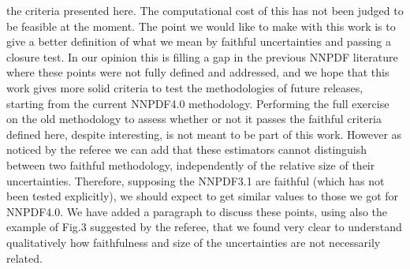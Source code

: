 \documentclass[11pt,a4paper]{article}
\numberwithin{equation}{section}
\numberwithin{figure}{section}
\numberwithin{table}{section}
\begin{document}
\begin{enumerate}
    the criteria presented here.
    The computational cost of this has not been judged to be feasible at the moment.
    The point we would like to make with this work is to give
    a better definition of what we mean by faithful uncertainties and passing a closure test.
    In our opinion this is filling a gap in the previous NNPDF literature where these points 
    were not fully defined and addressed, and we hope that this work gives more solid criteria 
    to test the methodologies of future releases, starting from the current NNPDF4.0 methodology.
    Performing the full exercise on the old methodology to assess whether or not it passes the faithful
    criteria defined here, despite interesting, is not meant to be part of this work.
    However as noticed by the referee we can add that these estimators cannot distinguish 
    between two faithful methodology, independently of the relative size of their uncertainties.
    Therefore, supposing the NNPDF3.1 are faithful (which has not been tested explicitly),
    we should expect to get similar values to those we got for NNPDF4.0.
    We have added a paragraph to discuss these points, using also the example of Fig.3 suggested by the referee,
    that we found very clear to understand qualitatively how faithfulness and size of the uncertainties are 
    not necessarily related. 


\end{enumerate}
\end{document}
